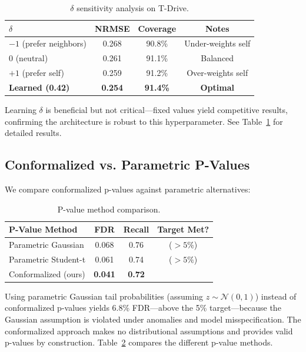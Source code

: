 \documentclass{article}
\newcommand{\cmark}{\ding{51}}
\newcommand{\xmark}{\ding{55}}
\theoremstyle{plain}
\theoremstyle{definition}
\theoremstyle{remark}
\begin{document}
\begin{table}[H]
\centering
\caption{$\delta$ sensitivity analysis on T-Drive.}
\label{tab:delta_sensitivity}
\begin{tabular}{lccc}
\toprule
$\delta$ & NRMSE & Coverage & Notes \\
\midrule
$-1$ (prefer neighbors) & 0.268 & 90.8\% & Under-weights self \\
$0$ (neutral) & 0.261 & 91.1\% & Balanced \\
$+1$ (prefer self) & 0.259 & 91.2\% & Over-weights self \\
\textbf{Learned (0.42)} & \textbf{0.254} & \textbf{91.4\%} & \textbf{Optimal} \\
\bottomrule
\end{tabular}
\end{table}

Learning $\delta$ is beneficial but not critical---fixed values yield competitive results, confirming the architecture is robust to this hyperparameter. See Table~\ref{tab:delta_sensitivity} for detailed results.

\subsection{Conformalized vs. Parametric P-Values}
\label{app:parametric_pvalues}

We compare conformalized p-values against parametric alternatives:

\begin{table}[H]
\centering
\caption{P-value method comparison.}
\label{tab:pvalue_methods}
\begin{tabular}{lccc}
\toprule
\textbf{P-Value Method} & \textbf{FDR} & \textbf{Recall} & \textbf{Target Met?} \\
\midrule
Parametric Gaussian & 0.068 & 0.76 & \xmark ($>5\%$) \\
Parametric Student-t & 0.061 & 0.74 & \xmark ($>5\%$) \\
Conformalized (ours) & \textbf{0.041} & \textbf{0.72} & \cmark \\
\bottomrule
\end{tabular}
\end{table}

Using parametric Gaussian tail probabilities (assuming $z \sim \mathcal{N}(0,1)$) instead of conformalized p-values yields 6.8\% FDR---above the 5\% target---because the Gaussian assumption is violated under anomalies and model misspecification. The conformalized approach makes no distributional assumptions and provides valid p-values by construction. Table~\ref{tab:pvalue_methods} compares the different p-value methods.
\end{document}

